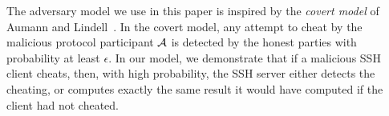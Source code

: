 
The adversary model we use in this paper is inspired by the \emph{covert
model} of Aumann and Lindell~\cite{aumannlindell}.  In the covert model,
any attempt to cheat by the malicious protocol participant ${\cal A}$
is detected by the honest parties with probability at least $\epsilon$.
In our model, we demonstrate that if a malicious SSH client cheats,
then, with high probability, the SSH server either detects the cheating,
or computes exactly the same result it would have computed if the client
had not cheated.

% 
% 
